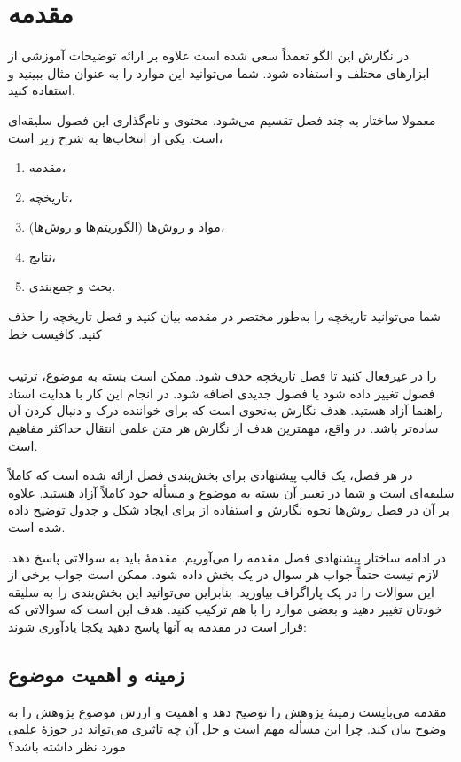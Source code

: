\chapter{مقدمه}
در نگارش این الگو تعمداً سعی شده است علاوه بر ارائه توضیحات آموزشی از ابزار‌های مختلف 
\xepersian 
و 
\latex 
استفاده شود. شما می‌توانید این موارد را به عنوان مثال ببینید و استفاده کنید. 

معمولا ساختار \thesis به چند فصل تقسیم می‌شود. محتوی و نام‌گذاری این فصول سلیقه‌ای است. یکی از انتخاب‌ها به شرح زیر است،
\begin{enumerate}
\item
مقدمه، 
\item 
تاریخچه، 
\item 
مواد و روش‌ها (الگوریتم‌ها و روش‌ها)، 
\item 
نتایج، 
\item 
بحث و جمع‌بندی.
\end{enumerate}
شما می‌توانید تاریخچه را به‌طور مختصر در مقدمه بیان کنید و فصل تاریخچه را حذف کنید. کافیست خط
\begin{latin}\begin{verbatim}

\end{verbatim}
\end{latin}\noindent
را در 
غیرفعال کنید تا فصل تاریخچه حذف شود. ممکن است بسته به موضوع، ترتیب فصول تغییر داده شود یا فصول جدیدی اضافه شود. در انجام این کار با هدایت استاد راهنما آزاد هستید. هدف نگارش 
\thesis 
به‌نحوی است که برای خواننده درک و دنبال کردن آن ساده‌تر باشد. در واقع، مهمترین هدف از نگارش هر متن علمی انتقال حداکثر مفاهیم است. 

در هر فصل، یک قالب پیشنهادی برای بخش‌بندی فصل ارائه شده است که کاملاً سلیقه‌ای است و شما در تغییر آن بسته به موضوع و مسأله خود کاملاً آزاد هستید. علاوه بر آن در فصل روش‌ها نحوه نگارش 
\thesis 
و استفاده از 
\latex 
برای ایجاد شکل و جدول توضیح داده شده است. 

در ادامه ساختار پیشنهادی فصل مقدمه را می‌آوریم. مقدمهٔ 
\thesis
باید به سوالاتی پاسخ دهد. لازم نیست حتماً جواب هر سوال در یک بخش داده شود. ممکن است جواب برخی از این سوالات را در یک پاراگراف بیاورید. بنابراین می‌توانید این بخش‌بندی را به سلیقه خودتان تغییر دهید و بعضی موارد را با هم ترکیب کنید. هدف این است که سوالاتی که قرار است در مقدمه به آنها پاسخ دهید یکجا یادآوری شوند:


\section{زمینه و اهمیت موضوع}
مقدمه می‌بایست زمینهٔ پژوهش را توضیح دهد و اهمیت و ارزش موضوع پژوهش را به وضوح بیان کند. چرا این مسأله مهم است و حل آن چه تاثیری می‌تواند در حوزهٔ علمی مورد نظر داشته باشد؟


